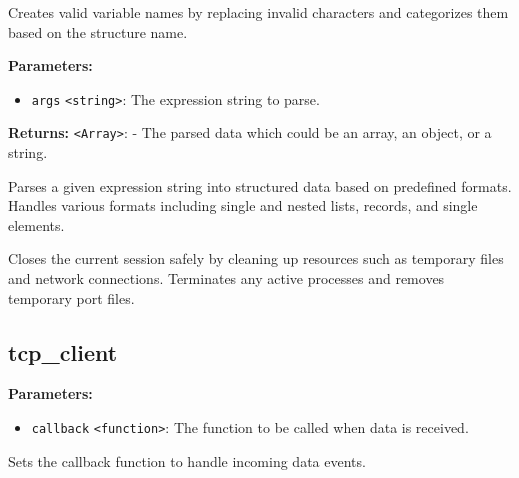 \documentclass[12pt,a4paper]{article}
\begin{document}
\noindent Creates valid variable names by replacing invalid characters and categorizes them based on the structure name.

\vspace{5mm}
\noindent {}


\noindent \textbf{Parameters:}
\begin{itemize}
  \item \texttt{args} \texttt{<string>}: The expression string to parse.
\end{itemize}

\noindent \textbf{Returns:} \texttt{<Array>}: - The parsed data which could be an array, an object, or a string.

\noindent Parses a given expression string into structured data based on predefined formats.
Handles various formats including single and nested lists, records, and single elements.

\vspace{5mm}
\noindent {}


\noindent Closes the current session safely by cleaning up resources such as temporary files and network connections.
Terminates any active processes and removes temporary port files.


\subsection{tcp\_client}
\vspace{5mm}
\noindent {}


\noindent \textbf{Parameters:}
\begin{itemize}
  \item \texttt{callback} \texttt{<function>}: The function to be called when data is received.
\end{itemize}

\noindent Sets the callback function to handle incoming data events.

\vspace{5mm}
\noindent {}
\end{document}

